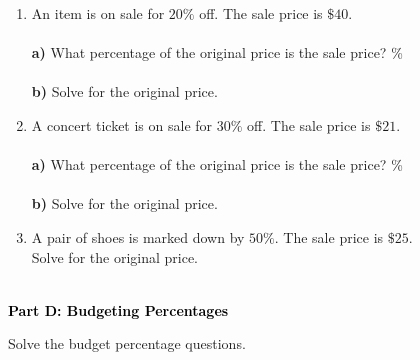 \documentclass[12pt, letterpaper, fleqn]{article}
\newcommand{\blank}{\underline{\hspace{2.2cm}}}
\begin{document}
\begin{enumerate}[itemsep=2.5cm, leftmargin=0.6cm]
\item An item is on sale for $20\%$ off. The sale price is $\$40$.  \\ \\
\textbf{a)} What percentage of the original price is the sale price? \blank \% \\ \\
\textbf{b)} Solve for the original price. \\


\item A concert ticket is on sale for $30\%$ off. The sale price is $\$21$. \\ \\
\textbf{a)} What percentage of the original price is the sale price? \blank \% \\ \\
\textbf{b)} Solve for the original price. \\

\item A pair of shoes is marked down by $50\%$. The sale price is $\$25$. \\
Solve for the original price. \\ \\

\end{enumerate}

\newpage

\begin{tcolorbox}[colback=black!10]
    \large\textcolor{black}{\textbf{Part D: Budgeting Percentages}}
\end{tcolorbox}

\vspace{3mm}

\noindent
Solve the budget percentage questions.

\vspace{5mm}
\end{document}

